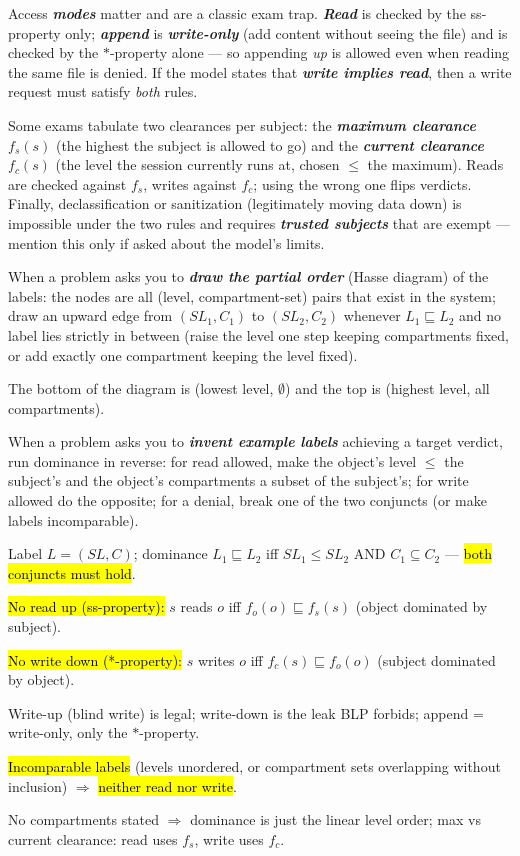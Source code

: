 \documentclass[12pt, a4paper]{article}
\newcommand{\term}[1]{\textbf{\textit{#1}}}        %
\newcommand{\imp}[1]{\hl{#1}}                       %
\begin{document}
Access \term{modes} matter and are a classic exam trap. \term{Read} is checked by the ss-property only; \term{append} is \term{write-only} (add content without seeing the file) and is checked by the $*$-property alone --- so appending \emph{up} is allowed even when reading the same file is denied.
If the model states that \term{write implies read}, then a write request must satisfy \emph{both} rules.

Some exams tabulate two clearances per subject: the \term{maximum clearance} $f_s(s)$ (the highest the subject is allowed to go) and the \term{current clearance} $f_c(s)$ (the level the session currently runs at, chosen $\leq$ the maximum).
Reads are checked against $f_s$, writes against $f_c$; using the wrong one flips verdicts. Finally, declassification or sanitization (legitimately moving data down) is impossible under the two rules and requires \term{trusted subjects} that are exempt --- mention this only if asked about the model's limits.

When a problem asks you to \term{draw the partial order} (Hasse diagram) of the labels: the nodes are all (level, compartment-set) pairs that exist in the system; draw an upward edge from $(SL_1, C_1)$ to $(SL_2, C_2)$ whenever $L_1 \sqsubseteq L_2$ and no label lies strictly in between (raise the level one step keeping compartments fixed, or add exactly one compartment keeping the level fixed).

The bottom of the diagram is (lowest level, $\emptyset$) and the top is (highest level, all compartments).

When a problem asks you to \term{invent example labels} achieving a target verdict, run dominance in reverse: for read allowed, make the object's level $\leq$ the subject's and the object's compartments a subset of the subject's; for write allowed do the opposite; for a denial, break one of the two conjuncts (or make labels incomparable).

\begin{theorybox}
\begin{tightitem}
    \item Label $L = (SL, C)$; dominance $L_1 \sqsubseteq L_2$ iff $SL_1 \leq SL_2$ AND $C_1 \subseteq C_2$ --- \imp{both conjuncts must hold}.
    \item \imp{No read up (ss-property):} $s$ reads $o$ iff $f_o(o) \sqsubseteq f_s(s)$ (object dominated by subject).
    \item \imp{No write down (*-property):} $s$ writes $o$ iff $f_c(s) \sqsubseteq f_o(o)$ (subject dominated by object).
    \item Write-up (blind write) is legal; write-down is the leak BLP forbids; append = write-only, only the $*$-property.
    \item \imp{Incomparable labels} (levels unordered, or compartment sets overlapping without inclusion) $\Rightarrow$ \imp{neither read nor write}.
    \item No compartments stated $\Rightarrow$ dominance is just the linear level order; max vs current clearance: read uses $f_s$, write uses $f_c$.
\end{tightitem}
\end{theorybox}
\end{document}
